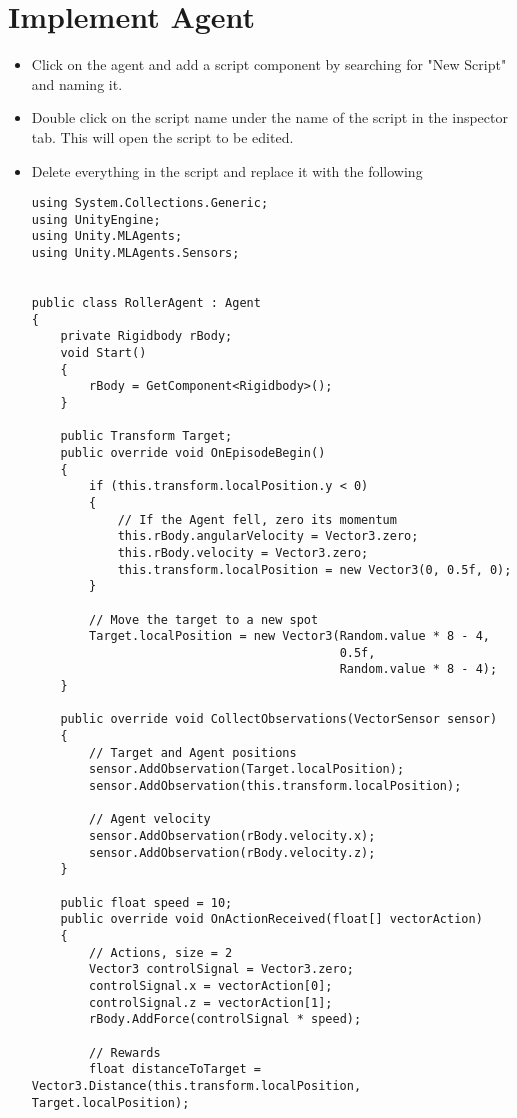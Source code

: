 \documentclass[11pt,fleqn,openany]{book} %
\begin{document}
\section{Implement Agent}
\begin{itemize}
    \item Click on the agent and add a script component by searching for "New Script" and naming it.
    \item Double click on the script name under the name of the script in the inspector tab. This will open the script to be edited.
    \item Delete everything in the script and replace it with the following \begin{verbatim}
using System.Collections.Generic;
using UnityEngine;
using Unity.MLAgents;
using Unity.MLAgents.Sensors;


public class RollerAgent : Agent
{
    private Rigidbody rBody;
    void Start()
    {
        rBody = GetComponent<Rigidbody>();
    }

    public Transform Target;
    public override void OnEpisodeBegin()
    {
        if (this.transform.localPosition.y < 0)
        {
            // If the Agent fell, zero its momentum
            this.rBody.angularVelocity = Vector3.zero;
            this.rBody.velocity = Vector3.zero;
            this.transform.localPosition = new Vector3(0, 0.5f, 0);
        }

        // Move the target to a new spot
        Target.localPosition = new Vector3(Random.value * 8 - 4,
                                           0.5f,
                                           Random.value * 8 - 4);
    }

    public override void CollectObservations(VectorSensor sensor)
    {
        // Target and Agent positions
        sensor.AddObservation(Target.localPosition);
        sensor.AddObservation(this.transform.localPosition);

        // Agent velocity
        sensor.AddObservation(rBody.velocity.x);
        sensor.AddObservation(rBody.velocity.z);
    }

    public float speed = 10;
    public override void OnActionReceived(float[] vectorAction)
    {
        // Actions, size = 2
        Vector3 controlSignal = Vector3.zero;
        controlSignal.x = vectorAction[0];
        controlSignal.z = vectorAction[1];
        rBody.AddForce(controlSignal * speed);

        // Rewards
        float distanceToTarget = Vector3.Distance(this.transform.localPosition, Target.localPosition);


\end{verbatim}
\end{itemize}
\end{document}
